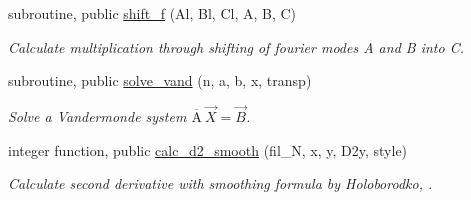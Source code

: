 \begin{DoxyCompactItemize}
subroutine, public \hyperlink{namespacenum__utilities_ac887f1cc7176167b352dedbd22ff2a57}{shift\+\_\+f} (Al, Bl, Cl, A, B, C)
\begin{DoxyCompactList}\small\item\em Calculate multiplication through shifting of fourier modes A and B into C. \end{DoxyCompactList}\item 
subroutine, public \hyperlink{namespacenum__utilities_a54c65e345182e2e7e13ac14a0ba3647a}{solve\+\_\+vand} (n, a, b, x, transp)
\begin{DoxyCompactList}\small\item\em Solve a Vandermonde system $\overline{\text{A}} \ \vec{X} = \vec{B}$. \end{DoxyCompactList}\item 
integer function, public \hyperlink{namespacenum__utilities_ab4c91a6478c4dd6f519f8ccbccc4094f}{calc\+\_\+d2\+\_\+smooth} (fil\+\_\+N, x, y, D2y, style)
\begin{DoxyCompactList}\small\item\em Calculate second derivative with smoothing formula by Holoborodko, \cite{holoborodko2008diff}. \end{DoxyCompactList}\end{DoxyCompactItemize}
